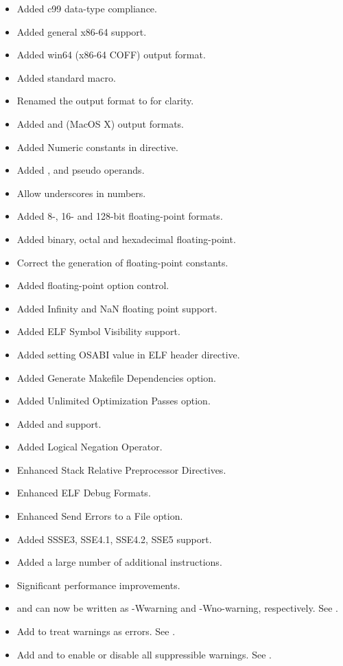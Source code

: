 
\begin{itemize}
    \item{Added c99 data-type compliance.}
    \item{Added general x86-64 support.}
    \item{Added win64 (x86-64 COFF) output format.}
    \item{Added  standard macro.}
    \item{Renamed the  output format to  for clarity.}
    \item{Added  and  (MacOS X) output formats.}
    \item{Added Numeric constants in  directive.}
    \item{Added ,  and  pseudo operands.}
    \item{Allow underscores in numbers.}
    \item{Added 8-, 16- and 128-bit floating-point formats.}
    \item{Added binary, octal and hexadecimal floating-point.}
    \item{Correct the generation of floating-point constants.}
    \item{Added floating-point option control.}
    \item{Added Infinity and NaN floating point support.}
    \item{Added ELF Symbol Visibility support.}
    \item{Added setting OSABI value in ELF header directive.}
    \item{Added Generate Makefile Dependencies option.}
    \item{Added Unlimited Optimization Passes option.}
    \item{Added  and  support.}
    \item{Added Logical Negation Operator.}
    \item{Enhanced Stack Relative Preprocessor Directives.}
    \item{Enhanced ELF Debug Formats.}
    \item{Enhanced Send Errors to a File option.}
    \item{Added SSSE3, SSE4.1, SSE4.2, SSE5 support.}
    \item{Added a large number of additional instructions.}
    \item{Significant performance improvements.}
    \item{ and  can now be written
        as -Wwarning and -Wno-warning, respectively. See .}
    \item{Add  to treat warnings as errors. See .}
    \item{Add  and  to enable or disable all suppressible
        warnings. See .}
\end{itemize}

